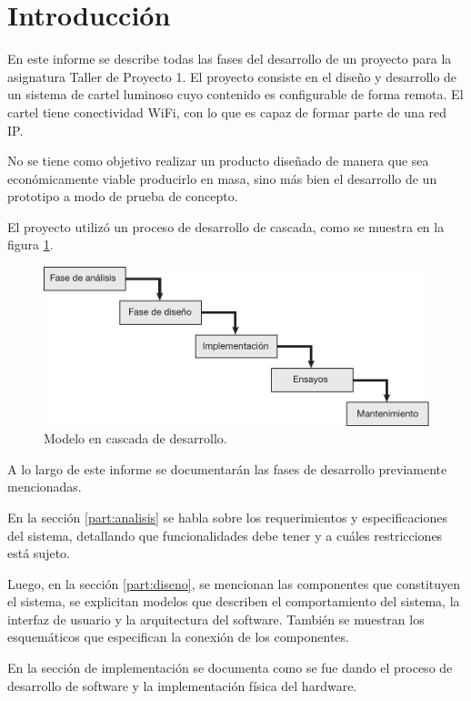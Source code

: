 \section{Introducción}
En este informe se describe todas las fases del desarrollo de un proyecto para la asignatura Taller de Proyecto 1. El proyecto consiste en el diseño y desarrollo de un sistema de cartel luminoso cuyo contenido es configurable de forma remota. El cartel tiene conectividad WiFi, con lo que es capaz de formar parte de una red IP.

No se tiene como objetivo realizar un producto diseñado de manera que sea económicamente viable producirlo en masa, sino más bien el desarrollo de un prototipo a modo de prueba de concepto.

El proyecto utilizó un proceso de desarrollo de cascada, como se muestra en la figura \ref{fig:waterfall}.

\begin{figure}[!htbp]
	\centering
	\includegraphics[width=\linewidth]{imagenes/waterfall.pdf}
	\caption{Modelo en cascada de desarrollo.}
	\label{fig:waterfall}
\end{figure}

A lo largo de este informe se documentarán las fases de desarrollo previamente mencionadas.

En la sección \ref{part:analisis} se habla sobre los requerimientos y especificaciones del sistema, detallando que funcionalidades debe tener y a cuáles restricciones está sujeto.

Luego, en la sección \ref{part:diseno}, se mencionan las componentes que constituyen el sistema, se explicitan modelos que describen el comportamiento del sistema, la interfaz de usuario y la arquitectura del software. También se muestran los esquemáticos que especifican la conexión de los componentes.

En la sección de implementación se documenta como se fue dando el proceso de desarrollo de software y la implementación física del hardware.


